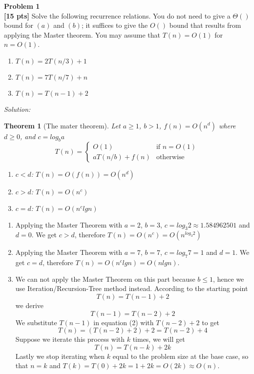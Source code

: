 \documentclass{article}
\newtheorem{theorem}{Theorem}
\newenvironment{problem}[2][Problem]
    { \begin{mdframed}[backgroundcolor=gray!20] \textbf{#1 #2} \\}
    {  \end{mdframed}}
\newenvironment{solution}
    {\textit{Solution:}}
    {}
\begin{document}
\begin{problem}{1}
\textbf{[15 pts]}
Solve the following recurrence relations. You do not need to give a $\Theta()$ bound for $(a)$ and $(b)$; it suffices to give the $O()$ bound that results from applying the Master theorem. You may assume that $T(n) = O(1)$ for $n = O(1)$.
	\begin{enumerate}
		\item $T(n) = 2T(n/3) + 1$
		\item $T(n) = 7T(n/7) + n$
		\item $T(n) = T(n - 1) + 2$
	\end{enumerate}
\end{problem}
\begin{solution}
	\begin{theorem}[The mater theorem]
		Let $a\geq 1$, $b > 1$, $f(n) = O(n^d)$ where $d\geq 0$, and $c = log_{b}a$
		\begin{equation} 
 			T(n) = 
			\begin{cases}
 				O(1)  & \text{if $n = O(1)$} \\
 				aT(n/b) + f(n) & \text{otherwise}
			\end{cases}
		\end{equation}
		\begin{enumerate}[leftmargin=*]
		\item $c < d$: $T(n) = O(f(n)) = O(n^d)$
		\item $c > d$: $T(n) = O(n^c)$
		\item $c = d$: $T(n) = O(n^c lg n)$
		\end{enumerate}
	\end{theorem}
	\begin{enumerate}
		\item 
		Applying the Master Theorem with $a = 2$, $b = 3$, $c = log_{3}2 \approx 1.584962501$ and $d = 0$. We get $c > d$, therefore $T(n) = O(n^c) = O(n^{log_{3}2})$
		\item
		Applying the Master Theorem with $a = 7$, $b = 7$, $c = log_{7}7 = 1$ and $d = 1$. We get $c = d$, therefore $T(n) = O(n^c lg n) = O(nlgn)$.
		\item
		We can not apply the Master Theorem on this part because $b\leq 1$, hence we use Iteration/Recursion-Tree method instead.
		\newline
		According to the starting point
		\begin{equation}
			T(n) = T(n - 1) + 2
		\end{equation}
		we derive
		\begin{equation}
			T(n - 1) = T(n - 2) + 2
		\end{equation}
		We substitute $T(n - 1)$ in equation (2) with $T(n - 2) + 2$ to get
		\begin{equation}
			T(n) = (T(n - 2) + 2) + 2 = T(n - 2) + 4
		\end{equation}
		Suppose we iterate this process with $k$ times, we will get
		\begin{equation}
			T(n) = T(n - k) + 2k
		\end{equation}
		Lastly we stop iterating when $k$ equal to the problem size at the base case, so that $n = k$ and $T(k) = T(0) + 2k = 1 + 2k = O(2k)\approx O(n)$.
		

\end{enumerate}
\end{solution}
\end{document}
